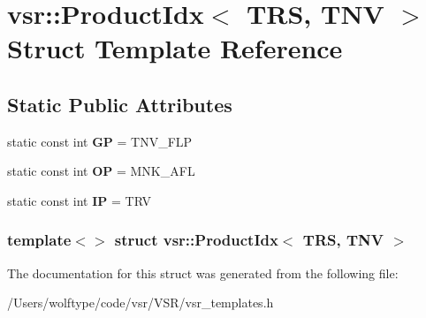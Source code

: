 \hypertarget{structvsr_1_1_product_idx_3_01_t_r_s_00_01_t_n_v_01_4}{\section{vsr\-:\-:Product\-Idx$<$ T\-R\-S, T\-N\-V $>$ Struct Template Reference}
\label{structvsr_1_1_product_idx_3_01_t_r_s_00_01_t_n_v_01_4}
}
\subsection*{Static Public Attributes}
\begin{DoxyCompactItemize}
\item 
\hypertarget{structvsr_1_1_product_idx_3_01_t_r_s_00_01_t_n_v_01_4_a044a44bae94a31c699e17469a4d2d907}{static const int {\bfseries G\-P} = T\-N\-V\-\_\-\-F\-L\-P}\label{structvsr_1_1_product_idx_3_01_t_r_s_00_01_t_n_v_01_4_a044a44bae94a31c699e17469a4d2d907}

\item 
\hypertarget{structvsr_1_1_product_idx_3_01_t_r_s_00_01_t_n_v_01_4_a22b2dfe381c736d6ce6e489f1ab6401a}{static const int {\bfseries O\-P} = M\-N\-K\-\_\-\-A\-F\-L}\label{structvsr_1_1_product_idx_3_01_t_r_s_00_01_t_n_v_01_4_a22b2dfe381c736d6ce6e489f1ab6401a}

\item 
\hypertarget{structvsr_1_1_product_idx_3_01_t_r_s_00_01_t_n_v_01_4_a886ad9616a980b0c4dfccedb3d0d0ef3}{static const int {\bfseries I\-P} = T\-R\-V}\label{structvsr_1_1_product_idx_3_01_t_r_s_00_01_t_n_v_01_4_a886ad9616a980b0c4dfccedb3d0d0ef3}

\end{DoxyCompactItemize}
\subsubsection*{template$<$$>$ struct vsr\-::\-Product\-Idx$<$ T\-R\-S, T\-N\-V $>$}



The documentation for this struct was generated from the following file\-:\begin{DoxyCompactItemize}
\item 
/\-Users/wolftype/code/vsr/\-V\-S\-R/vsr\-\_\-templates.\-h\end{DoxyCompactItemize}
